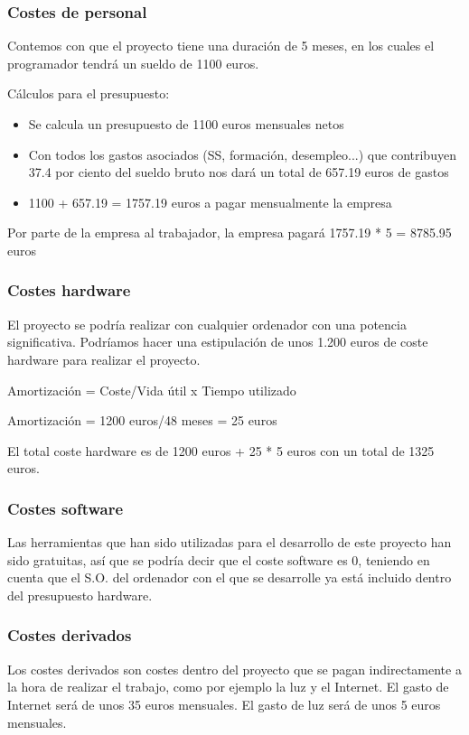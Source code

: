 \subsubsection{Costes de personal}
Contemos con que el proyecto tiene una duración de 5 meses, en los cuales el programador tendrá un sueldo de 1100 euros.

Cálculos para el presupuesto:

\begin{itemize}
	\item Se calcula un presupuesto de 1100 euros mensuales netos
	\item Con todos los gastos asociados (SS, formación, desempleo...) que contribuyen 37.4 por ciento del sueldo bruto nos dará un total de 657.19 euros de gastos
	\item 1100 + 657.19 =  1757.19 euros a pagar mensualmente la empresa
\end{itemize}

Por parte de la empresa al trabajador, la empresa pagará 1757.19 * 5 = 8785.95 euros



\subsubsection{Costes hardware}
El proyecto se podría realizar con cualquier ordenador con una potencia significativa.
Podríamos hacer una estipulación de unos 1.200 euros de coste hardware para realizar el proyecto.

Amortización = Coste/Vida útil x Tiempo utilizado

Amortización = 1200 euros/48 meses = 25 euros

El total coste hardware es de 1200 euros + 25 * 5 euros con un total de 1325 euros.

\subsubsection{Costes software}
Las herramientas que han sido utilizadas para el desarrollo de este proyecto han sido gratuitas, así que se podría decir que el coste software es 0, teniendo en cuenta que el S.O. del ordenador con el que se desarrolle ya está incluido dentro del presupuesto hardware.

\subsubsection{Costes derivados}
Los costes derivados son costes dentro del proyecto que se pagan indirectamente a la hora de realizar el trabajo, como por ejemplo la luz y el Internet.
El gasto de Internet será de unos 35 euros mensuales.
El gasto de luz será de unos 5 euros mensuales.

